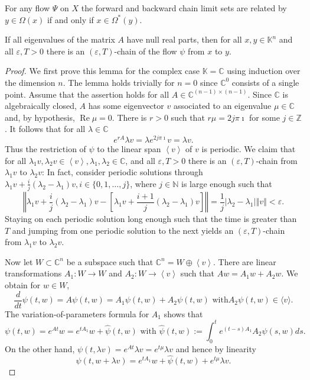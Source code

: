 \documentclass[10pt,a4paper]{amsart}
\begin{document}
\begin{proposition}
\label{LemCLSAtReverseTime}For any flow $\Psi$ on $X$ the forward and backward
chain limit sets are related by $y\in\Omega(x)$ if and only if $x\in
\Omega^{\ast}(y)$.
\end{proposition}

\begin{lemma}
\label{Lemma2_Eduardo}If all eigenvalues of the matrix $A$ have null real
parts, then for all $x,y\in\mathbb{K}^{n}$ and all $\varepsilon,T>0$ there is
an $(\varepsilon,T)$-chain of the flow $\psi$ from $x$ to $y$.
\end{lemma}

\begin{proof}
We first prove this lemma for the complex case $\mathbb{K}=\mathbb{C}$ using
induction over the dimension $n$. The lemma holds trivially for $n=0$ since
$\mathbb{C}^{0}$ consists of a single point. Assume that the assertion holds
for all $A\in\mathbb{C}^{(n-1)\times(n-1)}$. Since $\mathbb{C}$ is
algebraically closed, $A$ has some eigenvector $v$ associated to an eigenvalue
$\mu\in\mathbb{C}$ and, by hypothesis, $\operatorname{Re}\mu=0$. There is
$r>0$ such that $r\mu=2j\pi\imath$ for some $j\in\mathbb{Z}$. It follows that
for all $\lambda\in\mathbb{C}$%
\[
e^{rA}\lambda v=\lambda e^{2j\pi\imath}v=\lambda v.
\]
Thus the restriction of $\psi$ to the linear span $\left\langle v\right\rangle
$ of $v$ is periodic. We claim that for all $\lambda_{1}v,\lambda_{2}%
v\in\left\langle v\right\rangle ,\lambda_{1},\lambda_{2}\in\mathbb{C}$, and
all $\varepsilon,T>0$ there is an $(\varepsilon,T)$-chain from $\lambda_{1}v$
to $\lambda_{2}v$: In fact, consider periodic solutions through $\lambda
_{1}v+\frac{i}{j}(\lambda_{2}-\lambda_{1})v,i\in\{0,1,\ldots,j\}$, where
$j\in\mathbb{N}$ is large enough such that%
\[
\left\Vert \lambda_{1}v+\frac{i}{j}(\lambda_{2}-\lambda_{1})v-\left[
\lambda_{1}v+\frac{i+1}{j}(\lambda_{2}-\lambda_{1})v\right]  \right\Vert
=\frac{1}{j}\left\vert \lambda_{2}-\lambda_{1}\right\vert \left\Vert
v\right\Vert <\varepsilon.
\]
Staying on each periodic solution long enough such that the time is greater
than $T$ and jumping from one periodic solution to the next yields an
$(\varepsilon,T)$-chain from $\lambda_{1}v$ to $\lambda_{2}v$.

Now let $W\subset\mathbb{C}^{n}$ be a subspace such that $\mathbb{C}%
^{n}=W\oplus\left\langle v\right\rangle $. There are linear transformations
$A_{1}:W\rightarrow W$ and $A_{2}:W\rightarrow\left\langle v\right\rangle $
such that $Aw=A_{1}w+A_{2}w$. We obtain for $w\in W$,%
\[
\frac{d}{dt}\psi(t,w)=A\psi(t,w)=A_{1}\psi(t,w)+A_{2}\psi(t,w)\text{ with
}A_{2}\psi(t,w)\in\langle v\rangle.
\]
The variation-of-parameters formula for $A_{1}$ shows that%
\[
\psi(t,w)=e^{At}w=e^{tA_{1}}w+\widehat{\psi}(t,w)\text{ with }\widehat{\psi
}(t,w):=\int_{0}^{t}e^{(t-s)A_{1}}A_{2}\psi(s,w)ds.
\]
On the other hand, $\psi(t,\lambda v)=e^{At}\lambda v=e^{t\mu}\lambda v$ and
hence by linearity%
\begin{equation}
\psi(t,w+\lambda v)=e^{tA_{1}}w+\widehat{\psi}(t,w)+e^{t\mu}\lambda v.
\label{e_1}%
\end{equation}



\end{proof}
\end{document}
